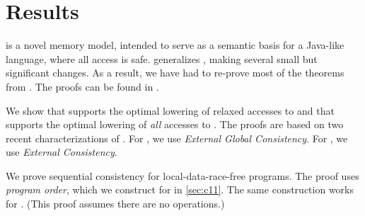 \section{\PwTmcaTITLE{} Results}
\label{sec:results}

\PwP{} %
is a novel memory model,
intended to serve as a semantic basis for a Java-like language, where all
access is safe.  \PwTmca{} generalizes \PwP{}, making several small but
significant changes.  As a result, we have had to re-prove most of the
theorems from \PwP{}.  The proofs can be found in \cite{appendix}.

We show that  supports the optimal
lowering of relaxed accesses to \armeight{} and that  supports the
optimal lowering of \emph{all} accesses to \armeight{}.  The proofs are based
on two recent characterizations of \armeight{} \cite{armed}.  For ,
we use \emph{External Global Consistency}.  For , we use
\emph{External Consistency}.

We prove sequential consistency for
local-data-race-free programs.  The proof uses \emph{program order}, which we
construct for \cXI{} in \textsection\ref{sec:c11}.  The same construction
works for \PwTmca{}.  (This proof assumes there are no \RMW{} operations.)

